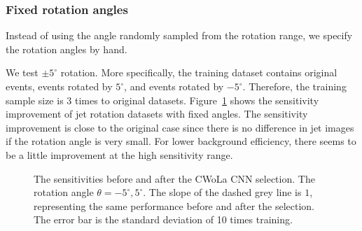 \documentclass[12pt]{article}
\begin{document}
		\subsubsection{Fixed rotation angles}%
		\label{subs:fixed_rotation_angles}
			Instead of using the angle randomly sampled from the rotation range, we specify the rotation angles by hand.

			We test $\pm 5^\circ$ rotation. More specifically, the training dataset contains original events, events rotated by $5^\circ$, and events rotated by $-5^\circ$. Therefore, the training sample size is 3 times to original datasets. Figure~\ref{fig:sensitivity_improvement_origin_jet_aug_angles_-5_5} shows the sensitivity improvement of jet rotation datasets with fixed angles. The sensitivity improvement is close to the original case since there is no difference in jet images if the rotation angle is very small. For lower background efficiency, there seems to be a little improvement at the high sensitivity range.
		\begin{figure}[htpb]
			\centering
			\caption{The sensitivities before and after the CWoLa CNN selection. The rotation angle $\theta = -5^\circ, 5^\circ$. The slope of the dashed grey line is $1$, representing the same performance before and after the selection. The error bar is the standard deviation of 10 times training.}
			\label{fig:sensitivity_improvement_origin_jet_aug_angles_-5_5}
		\end{figure}
\end{document}
